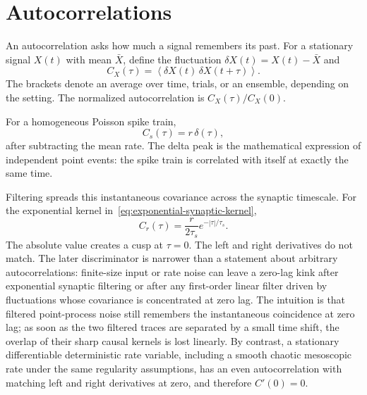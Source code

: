 \section{Autocorrelations}
\label{sec:autocorrelations}

An autocorrelation asks how much a signal remembers its past. For a stationary signal $X(t)$ with mean $\bar{X}$, define the fluctuation $\delta X(t)=X(t)-\bar{X}$ and
%
\begin{equation}
  C_X(\tau)
  =
  \left\langle
  \delta X(t)\,\delta X(t+\tau)
  \right\rangle.
  \label{eq:autocorrelation-definition}
\end{equation}
%
The brackets denote an average over time, trials, or an ensemble, depending on the setting. The normalized autocorrelation is $C_X(\tau)/C_X(0)$.

For a homogeneous Poisson spike train,
%
\begin{equation}
  C_s(\tau)
  =
  r\,\delta(\tau),
  \label{eq:poisson-spike-autocovariance}
\end{equation}
%
after subtracting the mean rate. The delta peak is the mathematical expression of independent point events: the spike train is correlated with itself at exactly the same time.

Filtering spreads this instantaneous covariance across the synaptic timescale. For the exponential kernel in~\eqref{eq:exponential-synaptic-kernel},
%
\begin{equation}
  C_r(\tau)
  =
  \frac{r}{2\tau_s}e^{-|\tau|/\tau_s}.
  \label{eq:filtered-poisson-autocovariance}
\end{equation}
%
The absolute value creates a cusp at $\tau=0$. The left and right derivatives do not match. The later discriminator is narrower than a statement about arbitrary autocorrelations: finite-size input or rate noise can leave a zero-lag kink after exponential synaptic filtering or after any first-order linear filter driven by fluctuations whose covariance is concentrated at zero lag. The intuition is that filtered point-process noise still remembers the instantaneous coincidence at zero lag; as soon as the two filtered traces are separated by a small time shift, the overlap of their sharp causal kernels is lost linearly. By contrast, a stationary differentiable deterministic rate variable, including a smooth chaotic mesoscopic rate under the same regularity assumptions, has an even autocorrelation with matching left and right derivatives at zero, and therefore $C'(0)=0$.

